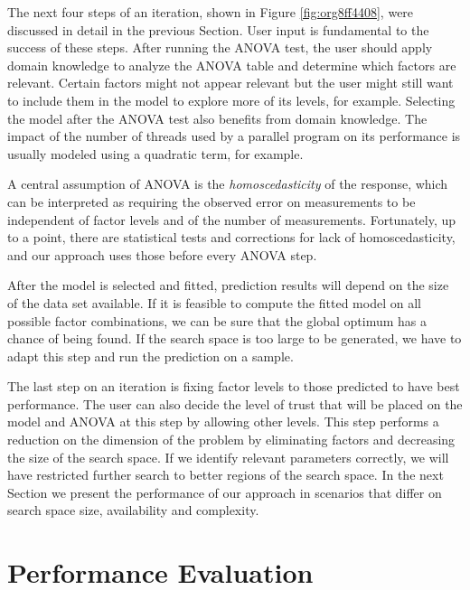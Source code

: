 \documentclass[conference]{IEEEtran}
\begin{document}
The next four steps of an iteration, shown in Figure \ref{fig:org8ff4408},
were discussed in detail in the previous Section. User input is fundamental to
the success of these steps. After running the ANOVA test, the user should apply
domain knowledge to analyze the ANOVA table and determine which factors are
relevant. Certain factors might not appear relevant but the user might still
want to include them in the model to explore more of its levels, for example.
Selecting the model after the ANOVA test also benefits from domain knowledge.
The impact of the number of threads used by a parallel program on its
performance is usually modeled using a quadratic term, for example.

A central assumption of ANOVA is the \emph{homoscedasticity} of the response, which
can be interpreted as requiring the observed error on measurements to be
independent of factor levels and of the number of measurements. Fortunately, up
to a point, there are statistical tests and corrections for lack of
homoscedasticity, and our approach uses those before every ANOVA step.

After the model is selected and fitted, prediction results will depend on the
size of the data set available. If it is feasible to compute the fitted model on
all possible factor combinations, we can be sure that the global optimum has a
chance of being found. If the search space is too large to be generated, we have
to adapt this step and run the prediction on a sample.

The last step on an iteration is fixing factor levels to those predicted to have
best performance. The user can also decide the level of trust that will be
placed on the model and ANOVA at this step by allowing other levels. This step
performs a reduction on the dimension of the problem by eliminating factors and
decreasing the size of the search space. If we identify relevant parameters
correctly, we will have restricted further search to better regions of the
search space. In the next Section we present the performance of our approach in
scenarios that differ on search space size, availability and complexity.
\section{Performance Evaluation}
\label{sec:org5034423}
\end{document}
